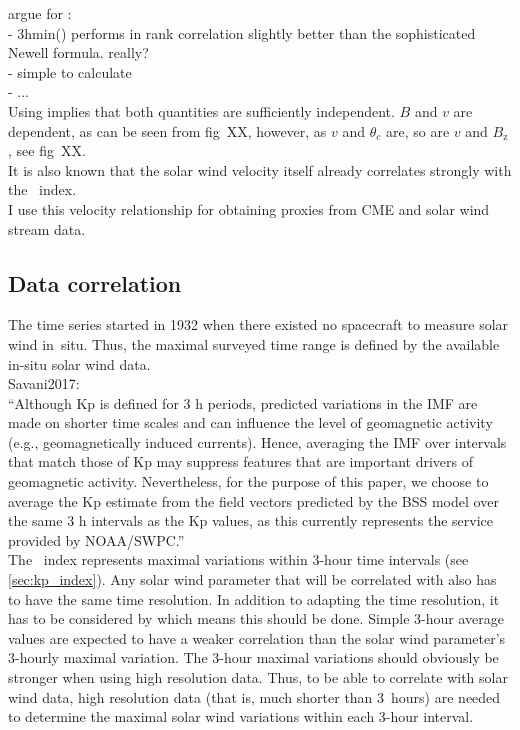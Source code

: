 argue for \vBz:\\
- 3hmin(\vBz) performs in rank correlation slightly better than the sophisticated Newell formula. really?\\
- simple to calculate\\
- ...\\


Using \vBz{} implies that both quantities are sufficiently independent. $B$ and $v$ are dependent, as can be seen from fig~XX, however, as $v$ and $\theta_c$ are, so are $v$ and $B_\text{z}$, see fig~XX.\\


It is also known that the solar wind velocity itself already correlates strongly with the \Kp~index.\\

I use this velocity relationship for obtaining \Kp{} proxies from CME and solar wind stream data.\\


\subsection{Data correlation}
\label{sec:data_correlation}
The \Kp{} time series started in 1932 when there existed no spacecraft to measure solar wind in~situ. Thus, the maximal surveyed time range is defined by the available in-situ solar wind data.\\

Savani2017:\\
``Although Kp is defined for 3 h periods, predicted variations in the IMF are made on shorter time scales and can influence the level of geomagnetic activity (e.g., geomagnetically induced currents). Hence, averaging the IMF over intervals that match those of Kp may suppress features that are important drivers of geomagnetic activity. Nevertheless, for the purpose of this paper, we choose to average the Kp estimate from the field vectors predicted by the BSS model over the same 3 h intervals as the Kp values, as this currently represents the service provided by NOAA/SWPC.''\\

The \Kp{}~index represents maximal variations within 3-hour time intervals (see \autoref{sec:kp_index}). Any solar wind parameter that will be correlated with \Kp{} also has to have the same time resolution. In addition to adapting the time resolution, it has to be considered by which means this should be done. Simple 3-hour average values are expected to have a weaker correlation than the solar wind parameter's 3-hourly maximal variation.
The 3-hour maximal variations should obviously be stronger when using high resolution data. Thus, to be able to correlate \Kp{} with solar wind data, high resolution data (that is, much shorter than 3~hours) are needed to determine the maximal solar wind variations within each 3-hour interval.\\

